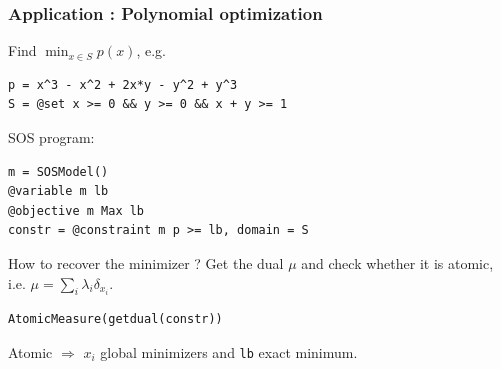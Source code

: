 \documentclass{beamer}
\begin{document}
\begin{frame}[fragile]
\begin{columns}
\begin{column}{0.4\textwidth}
      \end{column}
    \end{columns}
  \end{frame}
  \begin{frame}[fragile]
    \frametitle{Application : Polynomial optimization}
      Find $\min_{x \in S} p(x)$, e.g.
\begin{verbatim}
p = x^3 - x^2 + 2x*y - y^2 + y^3
S = @set x >= 0 && y >= 0 && x + y >= 1
\end{verbatim}
      SOS program:
\begin{verbatim}
m = SOSModel()
@variable m lb
@objective m Max lb
constr = @constraint m p >= lb, domain = S
\end{verbatim}
      How to recover the minimizer ?
      Get the dual $\mu$ and check whether it is atomic, i.e.
      \( \mu = \sum_i \lambda_i \delta_{x_i} \).
\begin{verbatim}
AtomicMeasure(getdual(constr))
\end{verbatim}
      Atomic $\Rightarrow$ $x_i$ global minimizers and \verb|lb| exact minimum.
  \end{frame}
\end{document}
